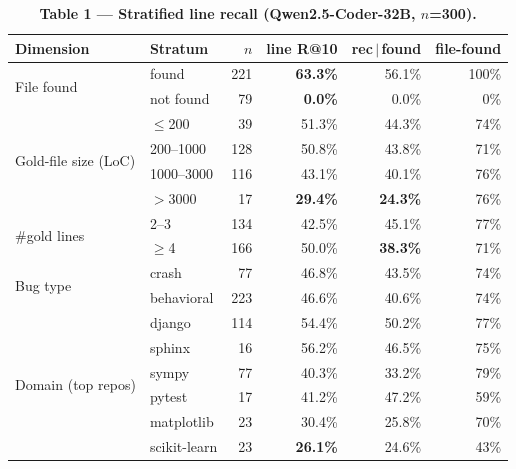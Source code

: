 \documentclass[11pt]{article}
\begin{document}
\begin{table}[t]
\centering\small
\caption*{\textbf{Table 1 --- Stratified line recall (Qwen2.5-Coder-32B, $n$=300).}}
\setlength{\tabcolsep}{6pt}
\begin{tabular}{llrrrr}
\toprule
Dimension & Stratum & $n$ & line R@10 & rec\,$|$\,found & file-found \\
\midrule
\multirow{2}{*}{File found} & found & 221 & \textbf{63.3\%} & 56.1\% & 100\% \\
 & not found & 79 & \textbf{0.0\%} & 0.0\% & 0\% \\
\cmidrule(lr){1-6}
\multirow{4}{*}{Gold-file size (LoC)} & $\le$200 & 39 & 51.3\% & 44.3\% & 74\% \\
 & 200--1000 & 128 & 50.8\% & 43.8\% & 71\% \\
 & 1000--3000 & 116 & 43.1\% & 40.1\% & 76\% \\
 & $>$3000 & 17 & \textbf{29.4\%} & \textbf{24.3\%} & 76\% \\
\cmidrule(lr){1-6}
\multirow{2}{*}{\#gold lines} & 2--3 & 134 & 42.5\% & 45.1\% & 77\% \\
 & $\ge$4 & 166 & 50.0\% & \textbf{38.3\%} & 71\% \\
\cmidrule(lr){1-6}
\multirow{2}{*}{Bug type} & crash & 77 & 46.8\% & 43.5\% & 74\% \\
 & behavioral & 223 & 46.6\% & 40.6\% & 74\% \\
\cmidrule(lr){1-6}
\multirow{6}{*}{Domain (top repos)} & django & 114 & 54.4\% & 50.2\% & 77\% \\
 & sphinx & 16 & 56.2\% & 46.5\% & 75\% \\
 & sympy & 77 & 40.3\% & 33.2\% & 79\% \\
 & pytest & 17 & 41.2\% & 47.2\% & 59\% \\
 & matplotlib & 23 & 30.4\% & 25.8\% & 70\% \\
 & scikit-learn & 23 & \textbf{26.1\%} & 24.6\% & 43\% \\
\bottomrule
\end{tabular}
\end{table}
\end{document}
